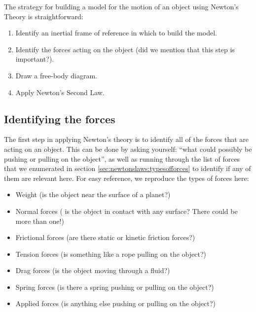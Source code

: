 The strategy for building a model for the motion of an object using Newton's Theory is straightforward:
\begin{enumerate}
\item Identify an inertial frame of reference in which to build the model.
\item Identify the forces acting on the object (did we mention that this step is important?).
\item Draw a free-body diagram.
\item Apply Newton's Second Law.
\end{enumerate}

\subsection{Identifying the forces}
The first step in applying Newton's theory is to identify all of the forces that are acting on an object. This can be done by asking yourself: ``what could possibly be pushing or pulling on the object'', as well as running through the list of forces that we enumerated in section \ref{sec:newtonslaws:typesofforces} to identify if any of them are relevant here. For easy reference, we reproduce the types of forces here:
\begin{itemize}
\item Weight (is the object near the surface of a planet?)
\item Normal forces ( is the object in contact with any surface? There could be more than one!)
\item Frictional forces (are there static or kinetic friction forces?)
\item Tension forces (is something like a rope pulling on the object?)
\item Drag forces (is the object moving through a fluid?)
\item Spring forces (is there a spring pushing or pulling on the object?)
\item Applied forces (is anything else pushing or pulling on the object?)
\end{itemize}

